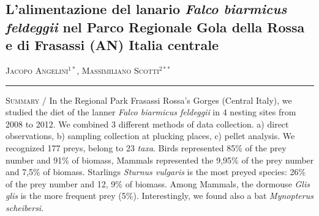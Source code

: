 \setcounter{figure}{0}
\setcounter{table}{0}

\begin{adjustwidth}{-3.5cm}{0cm}
\pagestyle{CIOpage}
\chapter*[L{\textquoteright}alimentazione del lanario. Parco
Regionale Gola Rossa e Frasassi]{L{\textquoteright}alimentazione del lanario
\textbf{\textit{Falco biarmicus feldeggii}}\textbf{ nel Parco
Regionale Gola della Rossa e di Frasassi (AN) Italia centrale}}

\textsc{Jacopo Angelini}$^{1*}$, \textsc{Massimiliano Scotti}$^{2**}$\\

 
\noindent\color{MUSEBLUE}\rule{27cm}{2pt}
\vspace{1cm}
\end{adjustwidth}



{\small

\noindent \textsc{\color{MUSEBLUE} Summary} / In the Regional Park Frasassi Rossa{\textquoteright}s Gorges (Central
Italy), we studied the diet of the lanner \textit{Falco biarmicus
feldeggii} in 4 nesting sites from 2008 to 2012. We combined 3
different methods of data collection. a) direct observations, b)
sampling collection at plucking places, c) pellet analysis. We
recognized 177 preys, belong to 23 \textit{taxa}. Birds represented
85\% of the prey number and 91\% of biomass, Mammals represented the
9,95\% of the prey number and 7,5\% of biomass. Starlings
\textit{Sturnus vulgaris} is the most preyed species: 26\% of the prey
number and 12, 9\% of biomass.
Among Mammals, the dormouse \textit{Glis glis} is the more frequent prey
(5\%).  Interestingly, we found also a bat \textit{Mynopterus
scheibersi}.
}

